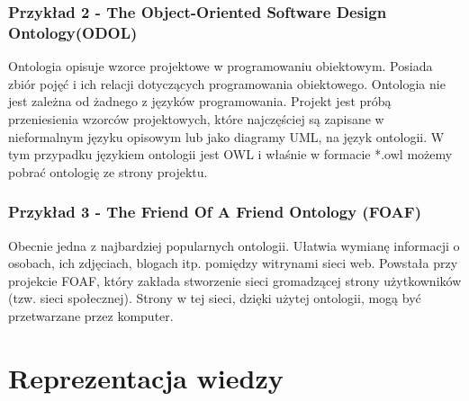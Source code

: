 \subsubsection*{Przykład 2 - The Object-Oriented Software Design Ontology(ODOL)}
Ontologia opisuje wzorce projektowe w programowaniu obiektowym. Posiada zbiór pojęć i ich relacji dotyczących programowania obiektowego. Ontologia nie jest zależna 
od żadnego z języków programowania. Projekt jest próbą przeniesienia wzorców projektowych, które najczęściej są zapisane w nieformalnym języku opisowym lub jako diagramy
UML, na język ontologii. W tym przypadku językiem ontologii jest OWL i właśnie w formacie *.owl możemy pobrać ontologię ze strony projektu. 


\subsubsection*{Przykład 3 - The Friend Of A Friend Ontology (FOAF)} 
Obecnie jedna z najbardziej popularnych ontologii. Ułatwia wymianę informacji o osobach, ich zdjęciach, blogach itp. pomiędzy witrynami sieci web. Powstała przy 
projekcie FOAF, który zakłada stworzenie sieci gromadzącej strony użytkowników (tzw. sieci społecznej). Strony w tej sieci, dzięki użytej ontologii, mogą być przetwarzane
przez komputer. 

\section{Reprezentacja wiedzy}
